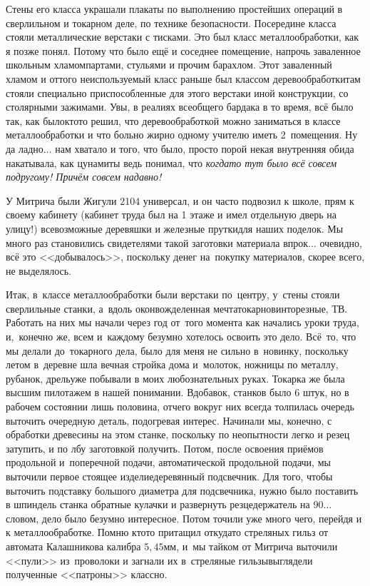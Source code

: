 Стены его класса украшали плакаты по выполнению простейших операций в сверлильном и токарном деле, по технике безопасности. Посередине класса стояли металлические верстаки с тисками. Это был класс металлообработки, как я позже понял. Потому что было ещё и соседнее помещение, напрочь заваленное школьным хламом\mdash партами, стульями и прочим барахлом. Этот заваленный хламом и оттого неиспользуемый класс раньше был классом деревообработки\mdash там стояли специально приспособленные для этого верстаки иной конструкции, со столярными зажимами. Увы, в реалиях всеобщего бардака в то время, всё было так, как было\mdash кто\sdash то решил, что деревообработкой можно заниматься в классе металлообработки и что больно жирно одному учителю иметь 2~помещения. Ну да ладно$\ldots$ нам хватало и того, что было, просто порой некая внутренняя обида накатывала, как цунами\mdash ты ведь понимал, что \textit{когда\sdash то тут было всё совсем по\sdash другому! Причём совсем надавно!} 

У Митрича были Жигули 2104 универсал, и он часто подвозил к школе, прям к своему кабинету (кабинет труда был на 1 этаже и имел отдельную дверь на улицу!) всевозможные деревяшки и железные прутки\mdash для наших поделок. Мы много раз становились свидетелями такой заготовки материала впрок$\ldots$ очевидно, всё это <<добывалось>>, поскольку денег на~покупку материалов, скорее всего, не выделялось.

Итак, в~классе металлообработки были верстаки по~центру, у~стены стояли сверлильные станки, а~вдоль окон\mdash вожделенная мечта\mdash токарно\sdash винторезные, ТВ. Работать на них мы начали через год от~того момента как начались уроки труда, и,~конечно же, всем и~каждому безумно хотелось освоить это дело. Всё~то, что мы делали до~токарного дела, было для меня не сильно в~новинку, поскольку летом в~деревне шла вечная стройка дома и~молоток, ножницы по металлу, рубанок, дрель\mdash уже побывали в моих любознательных руках. Токарка же была высшим пилотажем в нашей понимании. Вдобавок, станков было 6 штук, но в рабочем состоянии лишь половина, отчего вокруг них всегда толпилась очередь выточить очередную деталь, подогревая интерес. Начинали мы, конечно, с обработки древесины на этом станке, поскольку по неопытности легко и резец затупить, и по лбу заготовкой получить. Потом, после освоения приёмов продольной и~поперечной подачи, автоматической продольной подачи, мы выточили первое стоящее изделие\mdash деревянный подсвечник. Для того, чтобы выточить подставку большого диаметра для подсвечника, нужно было поставить в шпиндель станка обратные кулачки и развернуть резцедержатель на 90\degree$\ldots$ словом, дело было безумно интересное. Потом точили уже много чего, перейдя и к металлообработке. Помню кто\sdash то притащил откуда\sdash то стреляных гильз от автомата Калашникова калибра $5,45$\thinspace мм, и~мы тайком от Митрича выточили <<пули>> из~проволоки и загнали их в~стреляные гильзы\mdash выглядели полученные <<патроны>> классно. 


